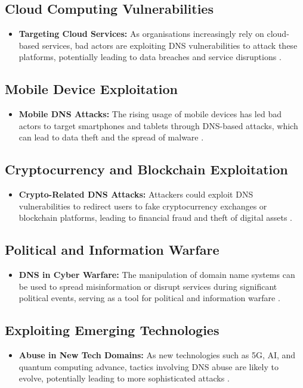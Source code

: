 \subsection{Cloud Computing Vulnerabilities}
\begin{itemize}
    \item \textbf{Targeting Cloud Services:} As organisations increasingly rely on cloud-based services, bad actors are exploiting DNS vulnerabilities to attack these platforms, potentially leading to data breaches and service disruptions \cite{mather2009cloud}.
\end{itemize}

\subsection{Mobile Device Exploitation}
\begin{itemize}
    \item \textbf{Mobile DNS Attacks:} The rising usage of mobile devices has led bad actors to target smartphones and tablets through DNS-based attacks, which can lead to data theft and the spread of malware \cite{au2016mobile}.
\end{itemize}

\subsection{Cryptocurrency and Blockchain Exploitation}
\begin{itemize}
    \item \textbf{Crypto-Related DNS Attacks:} Attackers could exploit DNS vulnerabilities to redirect users to fake cryptocurrency exchanges or blockchain platforms, leading to financial fraud and theft of digital assets \cite{bashir2019advanced}.
\end{itemize}

\subsection{Political and Information Warfare}
\begin{itemize}
    \item \textbf{DNS in Cyber Warfare:} The manipulation of domain name systems can be used to spread misinformation or disrupt services during significant political events, serving as a tool for political and information warfare \cite{chapple2021cyberwarfare}.
\end{itemize}

\subsection{Exploiting Emerging Technologies}
\begin{itemize}
    \item \textbf{Abuse in New Tech Domains:} As new technologies such as 5G, AI, and quantum computing advance, tactics involving DNS abuse are likely to evolve, potentially leading to more sophisticated attacks \cite{brunner2021cybersecurity}.
\end{itemize}

